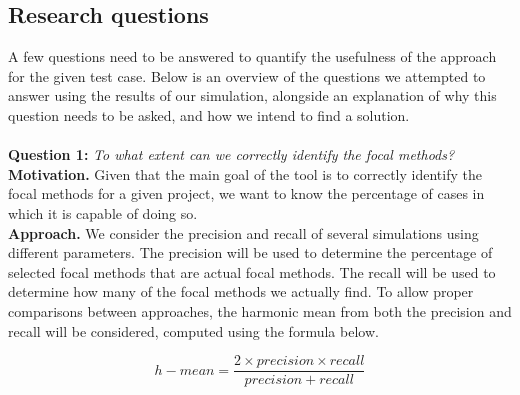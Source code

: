 \documentclass[11pt]{article}
\begin{document}
\begin{multicols}{2}
\subsection{Research questions}
A few questions need to be answered to quantify the usefulness of the approach for the given test case. Below is an overview of the questions we attempted to answer using the results of our simulation, alongside an explanation of why this question needs to be asked, and how we intend to find a solution.\\
\\
\noindent
\textbf{Question 1:} \textit{To what extent can we correctly identify the focal methods?}\\
\textbf{Motivation.} Given that the main goal of the tool is to correctly identify the focal methods for a given project, we want to know the percentage of cases in which it is capable of doing so. \\
\textbf{Approach.} We consider the precision and recall of several simulations using different parameters. The precision will be used to determine the percentage of selected focal methods that are actual focal methods. The recall will be used to determine how many of the focal methods we actually find. To allow proper comparisons between approaches, the harmonic mean from both the precision and recall will be considered, computed using the formula below.

\[h-mean = \frac{2 \times precision \times recall}{precision + recall}\]


\end{multicols}
\end{document}
